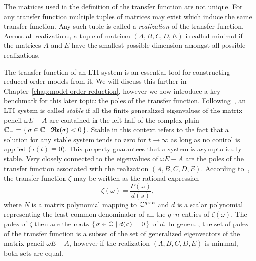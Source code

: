 \begin{remark}
    The matrices used in the definition of the transfer function are not unique.
    For any transfer function multiple tuples of matrices may exist which induce the same transfer function.
    Any such tuple is called a \emph{realization} of the transfer function.
    Across all realizations, a tuple of matrices $(A, B, C, D, E)$ is called minimal if the matrices $A$ and $E$ have the smallest possible dimension amongst all possible realizations.
\end{remark}

The transfer function of an LTI system is an essential tool for constructing reduced order models from it.
We will discuss this further in Chapter~\ref{chap:model-order-reduction}, however we now introduce a key benchmark for this later topic: the poles of the transfer function.
Following~\cite{Benner2017}, an LTI system is called \emph{stable} if all the finite generalized eigenvalues of the matrix pencil $\omega E - A$ are contained in the left half of the complex plain $\mathbb{C}_{-} = \left\{\,\sigma \in \mathbb{C}\mid\mathfrak{Re}(\sigma) < 0\,\right\}$.
Stable in this context refers to the fact that a solution for any stable system tends to zero for $t \rightarrow \infty$ as long as no control is applied ($u(t) \equiv 0$).
This property guarantees that a system is asymptotically stable.
Very closely connected to the eigenvalues of $\omega E - A$ are the poles of the transfer function associated with the realization $(A, B, C, D, E)$.
According to~\cite[Section~2]{Benner2017}, the transfer function $\zeta$ may be written as the rational expression
\begin{equation*}
    \zeta(\omega) = \frac{P(\omega)}{d(s)},
\end{equation*}
where $N$ is a matrix polynomial mapping to $\mathbb{C}^{q \times n}$ and $d$ is a scalar polynomial representing the least common denominator of all the $q \cdot n$ entries of $\zeta(\omega)$.
The poles of $\zeta$ then are the roots $\left\{\,\sigma \in \mathbb{C}\mid d(\sigma) = 0\,\right\}$ of $d$.
In general, the set of poles of the transfer function is a subset of the set of generalized eigenvectors of the matrix pencil $\omega E - A$, however if the realization $(A, B, C, D, E)$ is minimal, both sets are equal.

